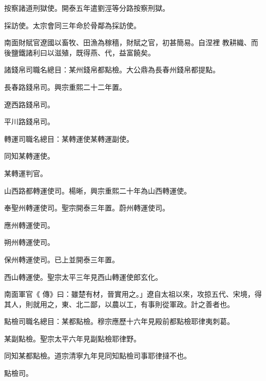 \begin{pinyinscope}
 按察諸道刑獄使。開泰五年遣劉涇等分路按察刑獄。



 採訪使。太宗會同三年命於骨鄰為採訪使。



 南面財賦官遼國以畜牧、田漁為稼穡，財賦之官，初甚簡易。自涅裡
 教耕織、而後鹽鐵諸利曰以滋殖，既得燕、代，益富饒矣。



 諸錢帛司職名總目：某州錢帛都點檢。大公鼎為長春州錢帛都提點。



 長春路錢帛司。興宗重熙二十二年置。



 遼西路錢帛司。



 平川路錢帛司。



 轉運司職名總目：某轉運使某轉運副使。



 同知某轉運使。



 某轉運判官。



 山西路都轉運使司。楊晰，興宗重熙二十年為山西轉運使。



 奉聖州轉運使司。聖宗開泰三年置。蔚州轉運使司。



 應州轉運使司。



 朔州轉運使司。



 保州轉運使司。已上並開泰三年置。



 西山轉運使。聖宗太平三年見西山轉運使郎玄化。



 南面軍官《
 傳》曰：雖楚有材，晉實用之。」遼自太祖以來，攻掠五代、宋境，得其人，則就用之，東、北二鄙，以農以工，有事則從軍政。計之善者也。



 點檢司職名總目：某都點檢。穆宗應歷十六年見殿前都點檢耶律夷刺葛。



 某副點檢。聖宗太平六年見副點檢耶律野。



 同知某都點檢。道宗清寧九年見同知點檢司事耶律撻不也。



 點檢司。




\end{pinyinscope}

